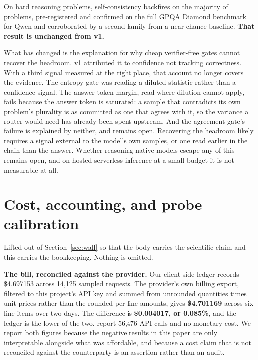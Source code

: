 \documentclass{article}
\begin{document}
On hard reasoning problems, self-consistency backfires on the majority of
problems, pre-registered and confirmed on the full GPQA Diamond benchmark for
Qwen and corroborated by a second family from a near-chance baseline.
\textbf{That result is unchanged from v1.}

What has changed is the explanation for why cheap verifier-free gates cannot
recover the headroom. v1 attributed it to confidence not tracking correctness.
With a third signal measured at the right place, that account no longer covers
the evidence. The entropy gate was reading a diluted statistic rather than a
confidence signal. The answer-token margin, read where dilution cannot apply,
fails because the answer token is saturated: a sample that contradicts its own
problem's plurality is as committed as one that agrees with it, so the variance
a router would need has already been spent upstream. And the agreement gate's
failure is explained by neither, and remains open. Recovering the headroom
likely requires a signal external to the model's own samples, or one read
earlier in the chain than the answer. Whether reasoning-native models escape
any of this remains open, and on hosted serverless inference at a small budget
it is not measurable at all.

\appendix

\section{Cost, accounting, and probe calibration}
\label{app:accounting}

Lifted out of Section~\ref{sec:wall} so that the body carries the scientific
claim and this carries the bookkeeping. Nothing is omitted.

\textbf{The bill, reconciled against the provider.} Our client-side ledger
records \$4.697153 across 14,125 sampled requests. The provider's own billing
export, filtered to this project's API key and summed from unrounded quantities
times unit prices rather than the rounded per-line amounts, gives
\textbf{\$4.701169} across six line items over two days. The difference is
\textbf{\$0.004017, or 0.085\%}, and the ledger is the lower of the two.
\citet{souza2026budget} report 56,476 API calls and no monetary cost. We report
both figures because the negative results in this paper are only interpretable
alongside what was affordable, and because a cost claim that is not reconciled
against the counterparty is an assertion rather than an audit.
\end{document}
